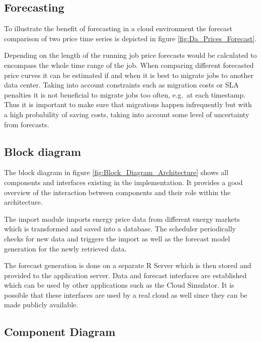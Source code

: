 \documentclass[paper=a4, fontsize=11pt]{scrartcl} %
\numberwithin{equation}{section} %
\numberwithin{figure}{section} %
\numberwithin{table}{section} %
\begin{document}

\subsection{Forecasting}

To illustrate the benefit of forecasting in a cloud environment the forecast comparison of two price time series is depicted in figure \ref{fig:Da_Prices_Forecast}. 

Depending on the length of the running job price forecasts would be calculated to encompass the whole time range of the job. When comparing different forecasted price curves it can be estimated if and when it is best to migrate jobs to another data center. Taking into account constraints such as migration costs or SLA penalties it is not beneficial to migrate jobs too often, e.g.~at each timestamp. Thus it is important to make sure that migrations happen infrequently but with a high probability of saving costs, taking into account some level of uncertainty from forecasts. 


\subsection{Block diagram}

The block diagram in figure \ref{fig:Block_Diagram_Architecture} shows all components and interfaces existing in the implementation. It provides a good overview of the interaction between components and their role within the architecture. 

The import module imports energy price data from different energy markets which is transformed and saved into a database. The scheduler periodically checks for new data and triggers the import as well as the forecast model generation for the newly retrieved data. 

The forecast generation is done on a separate R Server which is then stored and provided to the application server. Data and forecast interfaces are established which can be used by other applications such as the Cloud Simulator. It is possible that these interfaces are used by a real cloud as well since they can be made publicly available. 


\subsection{Component Diagram}
\end{document}
